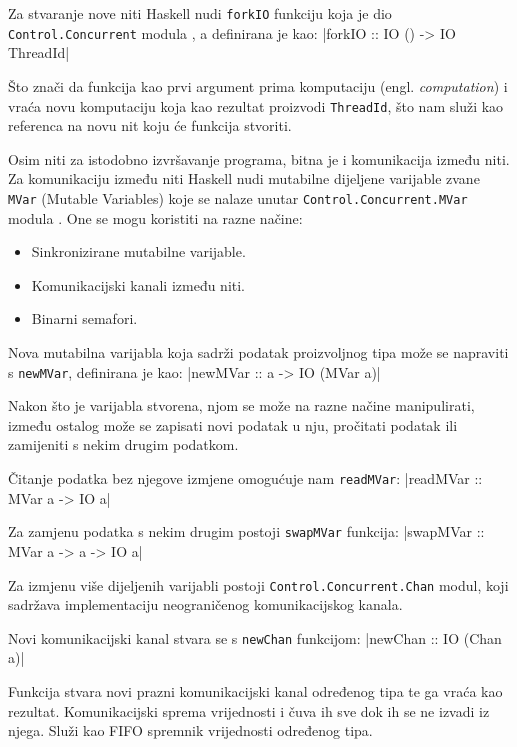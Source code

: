 Za stvaranje nove niti Haskell nudi \texttt{forkIO} funkciju koja
je dio \texttt{Control.Concurrent} modula
\cite{control_concurrent}, a definirana je kao:
|forkIO :: IO () -> IO ThreadId|

Što znači da funkcija kao prvi argument prima komputaciju (engl.
\emph{computation}) i vraća novu komputaciju koja kao rezultat proizvodi
\texttt{ThreadId}, što nam služi kao referenca na novu nit koju će
funkcija stvoriti.

Osim niti za istodobno izvršavanje programa, bitna je i komunikacija između niti.
Za komunikaciju između niti Haskell nudi mutabilne dijeljene varijable zvane
\texttt{MVar} (Mutable Variables) koje se nalaze unutar
\texttt{Control.Concurrent.MVar} modula \cite{mvar}. One se mogu
koristiti na razne načine:

\begin{itemize}
\item Sinkronizirane mutabilne varijable.
\item Komunikacijski kanali između niti.
\item Binarni semafori.
\end{itemize}

Nova mutabilna varijabla koja sadrži podatak proizvoljnog tipa može se napraviti
s \texttt{newMVar}, definirana je kao:
|newMVar :: a -> IO (MVar a)|

Nakon što je varijabla stvorena, njom se može na razne načine manipulirati, između
ostalog može se zapisati novi podatak u nju, pročitati podatak ili zamijeniti s
nekim drugim podatkom.

Čitanje podatka bez njegove izmjene omogućuje nam
\texttt{readMVar}:
|readMVar :: MVar a -> IO a|

Za zamjenu podatka s nekim drugim postoji \texttt{swapMVar}
funkcija:
|swapMVar :: MVar a -> a -> IO a|

Za izmjenu više dijeljenih varijabli postoji
\texttt{Control.Concurrent.Chan} \cite{conc.chan} modul, koji
sadržava implementaciju neograničenog komunikacijskog kanala.

Novi komunikacijski kanal stvara se s \texttt{newChan} funkcijom:
|newChan :: IO (Chan a)|

Funkcija stvara novi prazni komunikacijski kanal određenog tipa te ga vraća kao
rezultat. Komunikacijski sprema vrijednosti i čuva ih sve dok ih se ne izvadi iz
njega. Služi kao FIFO spremnik vrijednosti određenog tipa.

